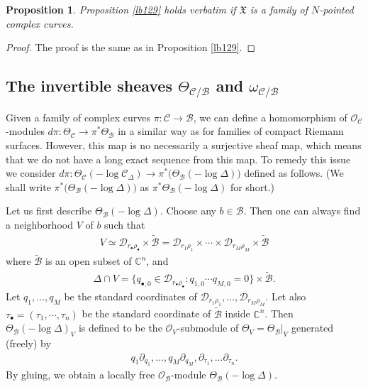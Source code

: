 \documentclass[12pt,a4paper,notitlepage]{report}
\theoremstyle{definition}
\theoremstyle{plain}
\newtheorem{pp}[df]{Proposition}
\newcommand{\fk}{\mathfrak}
\newcommand{\mc}{\mathcal}
\newcommand{\wtd}{\widetilde}
\newcommand{\scr}{\mathscr}
\newcommand{\blt}{\bullet}
\numberwithin{equation}{section}
\begin{document}
\begin{pp}
Proposition \ref{lb129} holds verbatim if $\fk X$ is a family of $N$-pointed complex curves.
\end{pp}

\begin{proof}
The proof is the same as in Proposition \ref{lb129}.
\end{proof}



\subsection*{The invertible sheaves $\Theta_{\mc C/\mc B}$ and $\omega_{\mc C/\mc B}$}

Given a family of complex curves $\pi:\mc C\rightarrow\mc B$, we can define a homomorphism of $\scr O_{\mc C}$-modules $d\pi:\Theta_{\mc C}\rightarrow\pi^*\Theta_{\mc B}$ in a similar way as  for families of compact Riemann surfaces. However, this map is no necessarily a surjective sheaf map, which means that we do not have a long exact sequence from this map. To remedy this issue we consider $d\pi:\Theta_{\mc C}(-\log \mc C_\Delta)\rightarrow \pi^*\big(\Theta_{\mc B}(-\log\Delta)\big)$ defined as follows. (We shall write $\pi^*\big(\Theta_{\mc B}(-\log\Delta)\big)$ as $\pi^*\Theta_{\mc B}(-\log\Delta)$ for short.)

Let us first describe $\Theta_{\mc B}(-\log\Delta)$. \index{zz@$\Theta_{\mc B}(-\log\Delta)$}  Choose any $b\in\mc B$. Then one can always find a  neighborhood $V$ of $b$ such that
\begin{align*}
V\simeq \mc D_{r_\blt\rho_\blt}\times\wtd{\mc B}=\mc D_{r_1\rho_1}\times\cdots\times\mc D_{r_M\rho_M}\times\wtd{\mc B}
\end{align*}
where $\wtd {\mc B}$ is an open subset of $\mathbb C^n$,   and
\begin{align*}
\Delta\cap V=\{q_{\blt,0}\in\mc D_{r_\blt\rho_\blt}:q_{1,0}\cdots q_{M,0}=0\}\times\wtd{\mc B}.
\end{align*}
Let $q_1,\dots,q_M$ be the standard coordinates of $\mc D_{r_1\rho_1},\dots,\mc D_{r_M\rho_M}$. Let also $\tau_\blt=(\tau_1,\cdots,\tau_n)$ be the standard coordinate of $\wtd {\mc B}$ inside $\mathbb C^n$. Then $\Theta_{\mc B}(-\log\Delta)_V$ is defined to be the $\scr O_V$-submodule of $\Theta_V=\Theta_{\mc B}|_V$ generated (freely) by
\begin{align}
q_1\partial_{q_1},\dots,q_M\partial_{q_M},\partial_{\tau_1},\dots\partial_{\tau_n}.\label{eq133}
\end{align}
By gluing, we obtain a locally free $\scr O_{\mc B}$-module $\Theta_{\mc B}(-\log\Delta)$.
\end{document}
